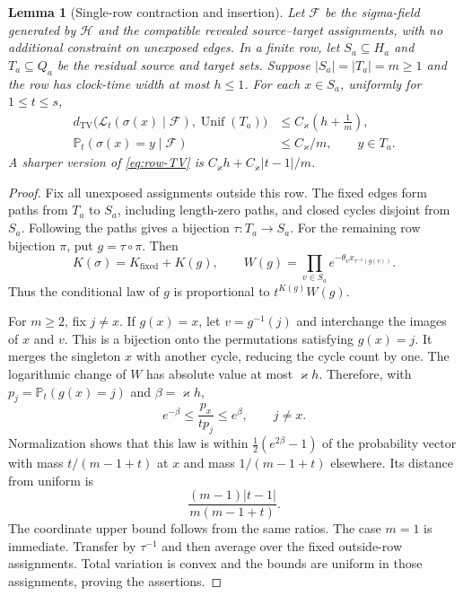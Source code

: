 \documentclass[11pt]{article}
\numberwithin{equation}{section}
\newtheorem{lemma}[theorem]{Lemma}
\theoremstyle{definition}
\theoremstyle{remark}
\newcommand{\Pp}{\mathbb P}
\newcommand{\TV}{\mathrm{TV}}
\newcommand{\Unif}{\operatorname{Unif}}
\newcommand{\cF}{\mathcal F}
\newcommand{\cH}{\mathcal H}
\begin{document}
\begin{lemma}[Single-row contraction and insertion]\label{lem:row-flatness}
Let $\cF$ be the sigma-field generated by $\cH$ and the compatible revealed
source--target assignments, with no additional constraint on unexposed edges.
In a finite row, let $S_a\subseteq H_a$ and $T_a\subseteq Q_a$ be the residual
source and target sets. Suppose $|S_a|=|T_a|=m\ge1$ and the row has clock-time
width at most $h\le1$. For each $x\in S_a$, uniformly for $1\le t\le s$,
\begin{align}
 d_{\TV}\bigl(\mathcal L_t(\sigma(x)\mid\cF),\Unif(T_a)\bigr)
 &\le C_\varkappa\left(h+\frac1m\right),\label{eq:row-TV}\\
 \Pp_t(\sigma(x)=y\mid\cF)&\le C_\varkappa/m,
 \qquad y\in T_a.\label{eq:row-upper}
\end{align}
A sharper version of \eqref{eq:row-TV} is $C_\varkappa h+C_\varkappa|t-1|/m$.
\end{lemma}
\begin{proof}
Fix all unexposed assignments outside this row. The fixed edges form paths from $T_a$ to $S_a$, including length-zero paths, and closed cycles disjoint from $S_a$. Following the paths gives a bijection $\tau:T_a\to S_a$. For the remaining row bijection $\pi$, put $g=\tau\circ\pi$. Then
\[
 K(\sigma)=K_{\mathrm{fixed}}+K(g),\qquad
 W(g)=\prod_{v\in S_a}e^{-\theta_v x_{\tau^{-1}(g(v))}}.
\]
Thus the conditional law of $g$ is proportional to $t^{K(g)}W(g)$.

For $m\ge2$, fix $j\ne x$. If $g(x)=x$, let $v=g^{-1}(j)$ and interchange the images of $x$ and $v$. This is a bijection onto the permutations satisfying $g(x)=j$. It merges the singleton $x$ with another cycle, reducing the cycle count by one. The logarithmic change of $W$ has absolute value at most $\varkappa h$. Therefore, with $p_j=\Pp_t(g(x)=j)$ and $\beta=\varkappa h$,
\begin{equation}\label{eq:insertion-ratio}
 e^{-\beta}\le\frac{p_x}{t p_j}\le e^\beta,\qquad j\ne x.
\end{equation}
Normalization shows that this law is within $\tfrac12(e^{2\beta}-1)$ of the probability vector with mass $t/(m-1+t)$ at $x$ and mass $1/(m-1+t)$ elsewhere. Its distance from uniform is
\[
 \frac{(m-1)|t-1|}{m(m-1+t)}.
\]
The coordinate upper bound follows from the same ratios. The case $m=1$ is immediate. Transfer by $\tau^{-1}$ and then average over the fixed outside-row assignments. Total variation is convex and the bounds are uniform in those assignments, proving the assertions.
\end{proof}
\end{document}
